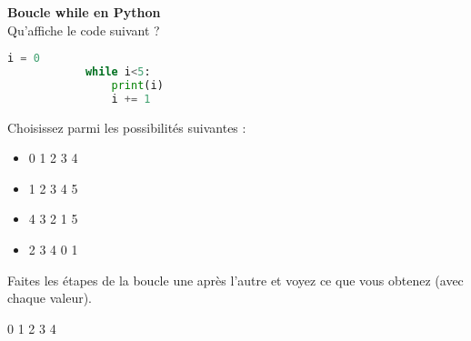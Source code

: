     
    \begin{Exercice}[5 minutes] \textbf{Boucle while en Python}\\
      	Qu'affiche le code suivant ?
      	
      	\begin{lstlisting}[language=Python]
                i = 0
    		while i<5:
        		print(i)
        		i += 1
        		 \end{lstlisting}
             	
        Choisissez parmi les possibilités suivantes :
        
        \begin{itemize}
        
        \item 0 
        1 
        2 
        3 
        4 
        \item 1  
        2 
        3 
        4 
        5 
        \item 4 
        3 
        2 
        1 
        5 
        \item 2 
        3 
        4 
        0 
        1
        \end{itemize}
    
        \begin{conseil}
		   Faites les étapes de la boucle une après l'autre et voyez ce que vous obtenez (avec chaque valeur).  
        \end{conseil}
        
        \begin{solution}
            0 
            1 
            2 
            3 
            4
        \end{solution}
    \end{Exercice}
    
